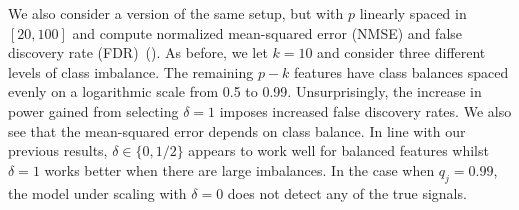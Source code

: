 We also consider a version of the same setup, but with \(p\) linearly spaced in \([20,
    100]\) and compute normalized mean-squared error (NMSE) and false discovery rate
(FDR)~(). As before, we let \(k = 10\) and consider three
different levels of class imbalance. The remaining \(p-k\) features have class balances
spaced evenly on a logarithmic scale from 0.5 to 0.99. Unsurprisingly, the increase in
power gained from selecting \(\delta = 1\) imposes increased false discovery rates. We also
see that the mean-squared error depends on class balance. In line with our previous
results, \(\delta \in \{0, 1/2\}\) appears to work well for balanced features whilst
\(\delta = 1\) works better when there are large imbalances. In the case when \(q_j =
0.99\), the model under scaling with \(\delta = 0\) does not detect any of the true
signals.

